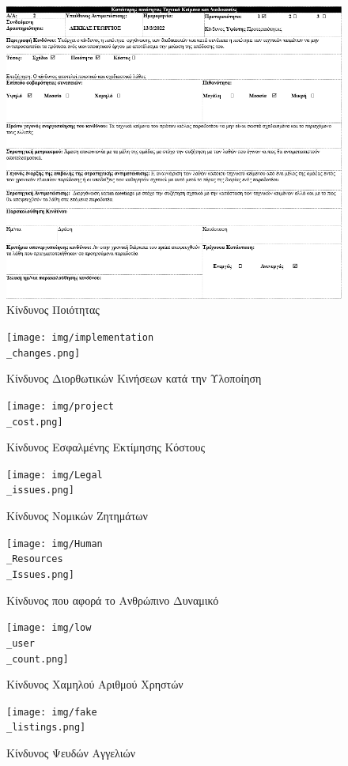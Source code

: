 \documentclass{../ol-softwaremanual}
\begin{document}
	\newpage
	
	
	
	\begin{figure}[htbp!]
		\includegraphics[scale=0.8]{img/bad quality.png}
		\caption{Κίνδυνος Ποιότητας}
	\end{figure}
	
	\newpage
	
	\begin{figure}[htbp!]
		\texttt{[image: img/implementation\\\_changes.png]}
		\caption{Κίνδυνος Διορθωτικών Κινήσεων κατά την Υλοποίηση}
	\end{figure}
	
	
	
	\newpage
	
	\begin{figure}[htbp!]
		\texttt{[image: img/project\\\_cost.png]}
		\caption{Κίνδυνος Εσφαλμένης Εκτίμησης Κόστους}
	\end{figure}
	
	\newpage
	
	\begin{figure}[htbp!]
		\texttt{[image: img/Legal\\\_issues.png]}
		\caption{Κίνδυνος Νομικών Ζητημάτων}
	\end{figure}
	
	
	\newpage
	
	\begin{figure}[htbp!]
		\texttt{[image: img/Human\\\_Resources\\\_Issues.png]}
		\caption{Kίνδυνος που αφορά το Ανθρώπινο Δυναμικό}
	\end{figure}

	\newpage

\begin{figure}[htbp!]
	\texttt{[image: img/low\\\_user\\\_count.png]}
	\caption{Kίνδυνος Χαμηλού Αριθμού Χρηστών}
\end{figure}
	
	\newpage
	\begin{figure}[htbp!]
		\texttt{[image: img/fake\\\_listings.png]}
		\caption{Kίνδυνος Ψευδών Αγγελιών}
	\end{figure}
	
	
	
\end{document}
